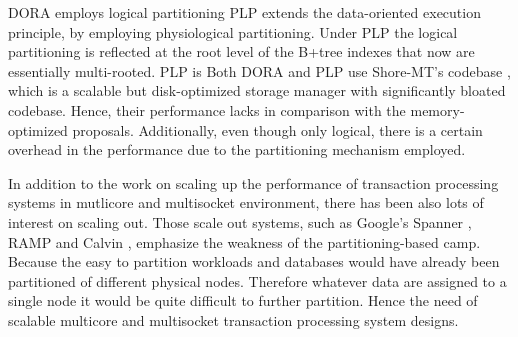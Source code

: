 DORA \cite{PandisJHA10}  employs logical partitioning 
PLP \cite{PandisTJA11} extends the data-oriented execution principle, by employing physiological partitioning. Under PLP the logical partitioning is reflected at the root level of the B+tree indexes that now are essentially multi-rooted. PLP is
Both DORA and PLP use Shore-MT's codebase \cite{JohnsonPHAF09}, which is a scalable but disk-optimized storage manager with significantly bloated codebase. Hence, their performance lacks in comparison with the memory-optimized proposals. Additionally, even though only logical, there is a certain overhead in the performance due to the partitioning mechanism employed.  

In addition to the work on scaling up the performance of transaction processing systems in mutlicore and multisocket environment, there has been also lots of interest on scaling out. Those scale out systems, such as Google's Spanner \cite{Corbett+12}, RAMP \cite{BailisFHGS14} and Calvin \cite{ThomsonA10}, emphasize the weakness of the partitioning-based camp. Because the easy to partition workloads and databases would have already been partitioned of different physical nodes. Therefore whatever data are assigned to a single node it would be quite difficult to further partition.  Hence the need of scalable multicore and multisocket transaction processing system designs.

